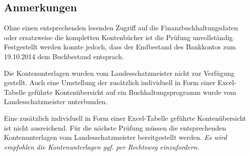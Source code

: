 \documentclass[%
	titlepage,oneside,12pt,headlines=1.5,numbers=noenddot, chapterprefix=false,parskip=full-,DIV=14,pagesize]{scrreprt}
\begin{document}
\subsection{Anmerkungen}
Ohne einen entsprechenden lesenden Zugriff auf die Finanzbuchhaltungsdaten oder ersatzweise die kompletten Kontenbücher ist die Prüfung unvollständig. Festgestellt werden konnte jedoch, dass der Endbestand des Bankkontos zum 19.10.2014 dem Buchbestand entsprach.

Die Kontenunterlagen wurden vom Landesschatzmeister nicht zur Verfügung gestellt. Auch eine Umstellung der zusätzlich individuell in Form einer Excel-Tabelle geführte Kontenübersicht auf ein Buchhaltungsprogramm wurde vom Landesschatzmeister unterbunden.

Eine zusätzlich individuell in Form einer Excel-Tabelle geführte Kontenübersicht ist nicht ausreichend. Für die nächste Prüfung müssen die entsprechenden Kontenunterlagen vom Landesschatzmeister bereitgestellt werden. \textit{Es wird empfohlen die Kontenunterlagen ggf. per Rechtsweg einzufordern.} 





\end{document}
